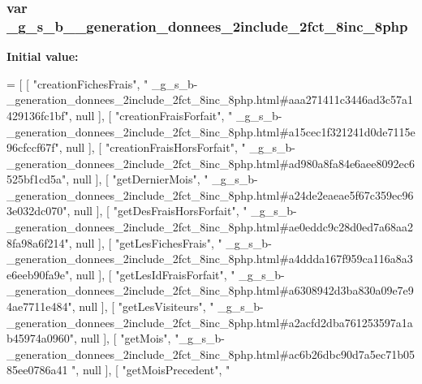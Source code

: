 \subsubsection[{\texorpdfstring{\+\_\+g\+\_\+s\+\_\+b\+\_\+\+\_\+generation\+\_\+donnees\+\_\+2include\+\_\+2fct\+\_\+8inc\+\_\+8php}{_g_s_b__generation_donnees_2include_2fct_8inc_8php}}]{\setlength{\rightskip}{0pt plus 5cm}var \+\_\+g\+\_\+s\+\_\+b\+\_\+\+\_\+generation\+\_\+donnees\+\_\+2include\+\_\+2fct\+\_\+8inc\+\_\+8php}\hypertarget{__g__s__b-__generation__donnees__2include__2fct__8inc__8php_8js_a4bd0c16bd8639f5249c57ea3194face6}{}\label{__g__s__b-__generation__donnees__2include__2fct__8inc__8php_8js_a4bd0c16bd8639f5249c57ea3194face6}
{\bfseries Initial value\+:}
\begin{DoxyCode}
=
[
    [ \textcolor{stringliteral}{"creationFichesFrais"}, \textcolor{stringliteral}{"
      \_g\_s\_b-\_generation\_donnees\_2include\_2fct\_8inc\_8php.html#aaa271411c3446ad3c57a1429136fc1bf"}, null ],
    [ \textcolor{stringliteral}{"creationFraisForfait"}, \textcolor{stringliteral}{"
      \_g\_s\_b-\_generation\_donnees\_2include\_2fct\_8inc\_8php.html#a15cec1f321241d0de7115e96cfccf67f"}, null ],
    [ \textcolor{stringliteral}{"creationFraisHorsForfait"}, \textcolor{stringliteral}{"
      \_g\_s\_b-\_generation\_donnees\_2include\_2fct\_8inc\_8php.html#ad980a8fa84e6aee8092ec6525bf1cd5a"}, null ],
    [ \textcolor{stringliteral}{"getDernierMois"}, \textcolor{stringliteral}{"
      \_g\_s\_b-\_generation\_donnees\_2include\_2fct\_8inc\_8php.html#a24de2eaeae5f67c359ec963e032dc070"}, null ],
    [ \textcolor{stringliteral}{"getDesFraisHorsForfait"}, \textcolor{stringliteral}{"
      \_g\_s\_b-\_generation\_donnees\_2include\_2fct\_8inc\_8php.html#ae0eddc9c28d0ed7a68aa28fa98a6f214"}, null ],
    [ \textcolor{stringliteral}{"getLesFichesFrais"}, \textcolor{stringliteral}{"
      \_g\_s\_b-\_generation\_donnees\_2include\_2fct\_8inc\_8php.html#a4ddda167f959ca116a8a3e6eeb90fa9e"}, null ],
    [ \textcolor{stringliteral}{"getLesIdFraisForfait"}, \textcolor{stringliteral}{"
      \_g\_s\_b-\_generation\_donnees\_2include\_2fct\_8inc\_8php.html#a6308942d3ba830a09e7e94ae7711e484"}, null ],
    [ \textcolor{stringliteral}{"getLesVisiteurs"}, \textcolor{stringliteral}{"
      \_g\_s\_b-\_generation\_donnees\_2include\_2fct\_8inc\_8php.html#a2acfd2dba761253597a1ab45974a0960"}, null ],
    [ \textcolor{stringliteral}{"getMois"}, \textcolor{stringliteral}{"\_g\_s\_b-\_generation\_donnees\_2include\_2fct\_8inc\_8php.html#ac6b26dbc90d7a5ec71b0585ee0786a41
      "}, null ],
    [ \textcolor{stringliteral}{"getMoisPrecedent"}, \textcolor{stringliteral}{"
}
\end{DoxyCode}
